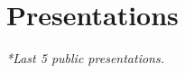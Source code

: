 \documentclass[print]{styles/friggeri-cv-mac} %
\begin{document}
%
%




\section{Presentations}\vspace{-5pt}
\textit{\small{*Last 5 public presentations.}}

\end{document}
